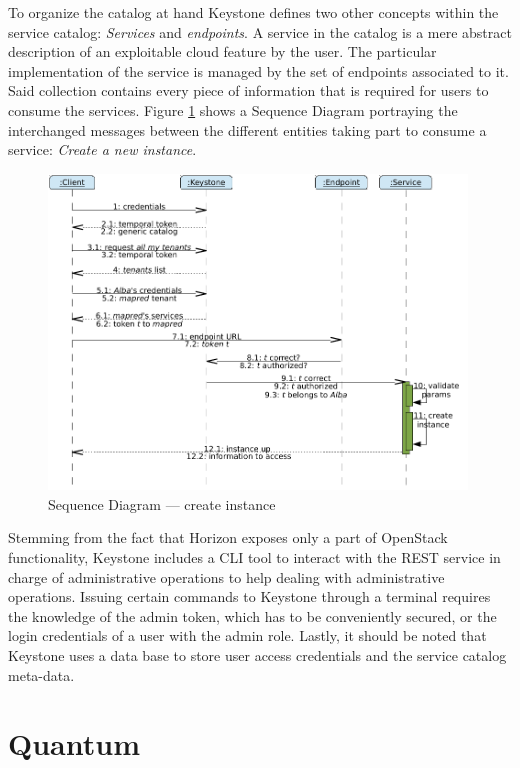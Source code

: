To organize the catalog at hand Keystone defines two other concepts within the service catalog: \emph{Services} and \emph{endpoints}. A service in the catalog is a mere abstract description of an exploitable cloud feature by the user. The particular implementation of the service is managed by the set of endpoints associated to it. Said collection contains every piece of information that is required for users to consume the services. Figure \ref{fig:secuenciais} shows a Sequence Diagram portraying the interchanged messages between the different entities taking part to consume a service: \emph{Create a new instance}.

\begin{figure}[tbp]
\begin{center}
\includegraphics[width=0.99\textwidth]{imagenes/013.pdf}
 \caption{Sequence Diagram --- create instance}
\label{fig:secuenciais}
\end{center}
\end{figure}

Stemming from the fact that Horizon exposes only a part of OpenStack functionality, Keystone includes a CLI tool to interact with the REST service in charge of administrative operations to help dealing with administrative operations. Issuing certain commands to Keystone through a terminal requires the knowledge of the admin token, which has to be conveniently secured, or the login credentials of a user with the admin role. Lastly, it should be noted that Keystone uses a data base to store user access credentials and the service catalog meta-data.

\section{Quantum}\label{sec:quantum}

